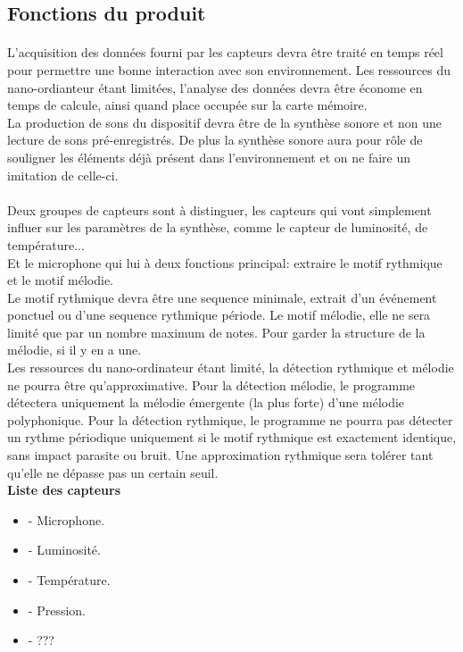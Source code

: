 \documentclass[a4paper, titlepage, oneside, 12pt]{article}%
\begin{document}
\subsection{Fonctions du produit}
\paragraph{}
L’acquisition des données fourni par les capteurs devra être traité en temps réel pour permettre une bonne interaction avec son environnement. Les ressources du nano-ordianteur étant limitées, l'analyse des données devra être économe en temps de calcule, ainsi quand place occupée sur la carte mémoire.\\
La production de sons du dispositif devra être de la synthèse sonore et non une lecture de sons pré-enregistrés. De plus la synthèse sonore aura pour rôle de souligner les éléments déjà présent dans l’environnement et on ne faire un imitation de celle-ci.

\paragraph{}
Deux groupes de capteurs sont à distinguer, les capteurs qui vont simplement influer sur les paramètres de la synthèse, comme le capteur de luminosité, de température... \\
Et le microphone qui lui à deux fonctions principal: extraire le motif rythmique et le motif mélodie.\\
Le motif rythmique devra être une sequence minimale, extrait d'un événement ponctuel ou d'une sequence rythmique période.
Le motif mélodie, elle ne sera limité que par un nombre maximum de notes. Pour garder la structure de la mélodie, si il y en a une.\\

Les ressources du nano-ordinateur étant limité, la détection rythmique et mélodie ne pourra être qu'approximative. Pour la détection mélodie, le programme détectera uniquement la mélodie émergente (la plus forte) d'une mélodie polyphonique. Pour la détection rythmique, le programme ne pourra pas détecter un rythme périodique uniquement si le motif rythmique est exactement identique, sans impact parasite ou bruit. Une approximation rythmique sera tolérer tant qu'elle ne dépasse pas un certain seuil.\\

\hspace{-6mm}\textbf{Liste des capteurs}
\begin {itemize}
\item[-] Microphone.
\item[-] Luminosité.
\item[-] Température.
\item[-] Pression.
\item[-] ???
\end{itemize}
\end{document}
